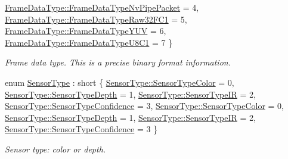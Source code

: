 \begin{DoxyCompactItemize}
\newline
\hyperlink{namespacemoetsi_1_1ssp_aa9b059f0bc7a91855545ee887f2d56c4a1628ff13722acd71d3e90b51c8faa31c}{Frame\+Data\+Type\+::\+Frame\+Data\+Type\+Nv\+Pipe\+Packet} = 4, 
\hyperlink{namespacemoetsi_1_1ssp_aa9b059f0bc7a91855545ee887f2d56c4abb6735708adc6efcecf59e0e1e6c9387}{Frame\+Data\+Type\+::\+Frame\+Data\+Type\+Raw32\+F\+C1} = 5, 
\hyperlink{namespacemoetsi_1_1ssp_aa9b059f0bc7a91855545ee887f2d56c4a6191c61c70f47aa00e2f9251d8ad59fa}{Frame\+Data\+Type\+::\+Frame\+Data\+Type\+Y\+UV} = 6, 
\hyperlink{namespacemoetsi_1_1ssp_aa9b059f0bc7a91855545ee887f2d56c4acd5fc2d48d13ef44a9806046ae34d56b}{Frame\+Data\+Type\+::\+Frame\+Data\+Type\+U8\+C1} = 7
 \}\begin{DoxyCompactList}\small\item\em Frame data type. This is a precise binary format information. \end{DoxyCompactList}
\item 
enum \hyperlink{namespacemoetsi_1_1ssp_abd5a57e44ab71b73d2e32a59887474de}{Sensor\+Type} \+: short \{ \newline
\hyperlink{namespacemoetsi_1_1ssp_abd5a57e44ab71b73d2e32a59887474dea896d4c904dda3d40337f16257ad819c9}{Sensor\+Type\+::\+Sensor\+Type\+Color} = 0, 
\hyperlink{namespacemoetsi_1_1ssp_abd5a57e44ab71b73d2e32a59887474dea38c56a32340ea03dd83b817cdbc15dd9}{Sensor\+Type\+::\+Sensor\+Type\+Depth} = 1, 
\hyperlink{namespacemoetsi_1_1ssp_abd5a57e44ab71b73d2e32a59887474dea06604c7f56c3ee7bcc422afac6239543}{Sensor\+Type\+::\+Sensor\+Type\+IR} = 2, 
\hyperlink{namespacemoetsi_1_1ssp_abd5a57e44ab71b73d2e32a59887474dea8fc6ffe5307d7e91425ea4a160a45fa2}{Sensor\+Type\+::\+Sensor\+Type\+Confidence} = 3, 
\newline
\hyperlink{namespacemoetsi_1_1ssp_abd5a57e44ab71b73d2e32a59887474dea896d4c904dda3d40337f16257ad819c9}{Sensor\+Type\+::\+Sensor\+Type\+Color} = 0, 
\hyperlink{namespacemoetsi_1_1ssp_abd5a57e44ab71b73d2e32a59887474dea38c56a32340ea03dd83b817cdbc15dd9}{Sensor\+Type\+::\+Sensor\+Type\+Depth} = 1, 
\hyperlink{namespacemoetsi_1_1ssp_abd5a57e44ab71b73d2e32a59887474dea06604c7f56c3ee7bcc422afac6239543}{Sensor\+Type\+::\+Sensor\+Type\+IR} = 2, 
\hyperlink{namespacemoetsi_1_1ssp_abd5a57e44ab71b73d2e32a59887474dea8fc6ffe5307d7e91425ea4a160a45fa2}{Sensor\+Type\+::\+Sensor\+Type\+Confidence} = 3
 \}\begin{DoxyCompactList}\small\item\em Sensor type\+: color or depth. \end{DoxyCompactList}
\item 

\end{DoxyCompactItemize}
